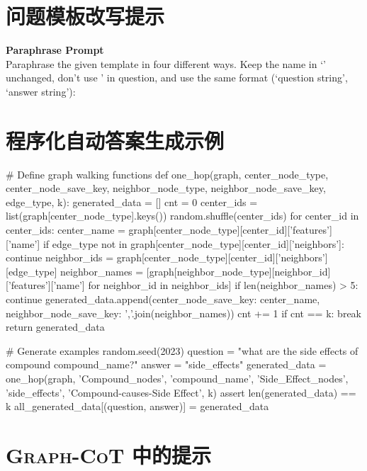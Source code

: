 \documentclass[11pt,UTF8,fontset=fandol]{ctexart}
\newenvironment{promptbox}{%
  \par\noindent\begin{minipage}{\linewidth}\centering
  \begin{minipage}{0.95\linewidth}\small\itshape
}{%
  \end{minipage}\end{minipage}\par\medskip
}
\begin{document}
\section{问题模板改写提示}

\begin{promptbox}
\textbf{Paraphrase Prompt}\\[4pt]
\normalfont Paraphrase the given template in four different ways. Keep the name in `' unchanged, don't use ' in question, and use the same format (`question string', `answer string'):
\end{promptbox}

\section{程序化自动答案生成示例}

\begin{code}
# Define graph walking functions
def one_hop(graph, center_node_type, center_node_save_key,
            neighbor_node_type, neighbor_node_save_key, edge_type, k):
    generated_data = []
    cnt = 0
    center_ids = list(graph[center_node_type].keys())
    random.shuffle(center_ids)
    for center_id in center_ids:
        center_name = graph[center_node_type][center_id]['features']['name']
        if edge_type not in graph[center_node_type][center_id]['neighbors']:
            continue
        neighbor_ids = graph[center_node_type][center_id]['neighbors'][edge_type]
        neighbor_names = [graph[neighbor_node_type][neighbor_id]['features']['name']
                          for neighbor_id in neighbor_ids]
        if len(neighbor_names) > 5:
            continue
        generated_data.append({center_node_save_key: center_name,
                               neighbor_node_save_key: ','.join(neighbor_names)})
        cnt += 1
        if cnt == k:
            break
    return generated_data

# Generate examples
random.seed(2023)
question = "what are the side effects of compound {compound_name}?"
answer = "{side_effects}"
generated_data = one_hop(graph, 'Compound_nodes', 'compound_name',
                         'Side_Effect_nodes', 'side_effects',
                         'Compound-causes-Side Effect', k)
assert len(generated_data) == k
all_generated_data[(question, answer)] = generated_data
\end{code}

\section{\textsc{Graph-CoT} 中的提示}
\end{document}
